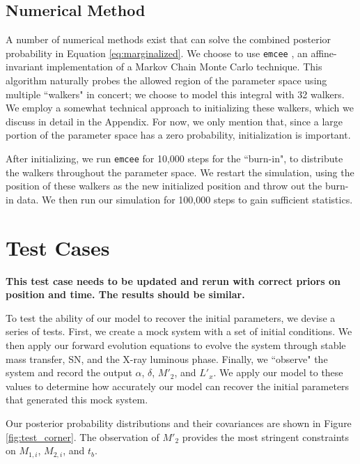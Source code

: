 \documentclass[12pt, preprint]{aastex}
\begin{document}
 


\subsection{Numerical Method}

A number of numerical methods exist that can solve the combined posterior probability in Equation \ref{eq:marginalized}. We choose to use {\tt emcee} \citep{foreman-mackey13}, an affine-invariant implementation of a Markov Chain Monte Carlo technique. This algorithm naturally probes the allowed region of the parameter space using multiple ``walkers" in concert; we choose to model this integral with 32 walkers. We employ a somewhat technical approach to initializing these walkers, which we discuss in detail in the Appendix. For now, we only mention that, since a large portion of the parameter space has a zero probability, initialization is important.

After initializing, we run {\tt emcee} for 10,000 steps for the ``burn-in", to distribute the walkers throughout the parameter space. We restart the simulation, using the position of these walkers as the new initialized position and throw out the burn-in data. We then run our simulation for 100,000 steps to gain sufficient statistics. 





\section{Test Cases}

{\bf This test case needs to be updated and rerun with correct priors on position and time. The results should be similar.}

To test the ability of our model to recover the initial parameters, we devise a series of tests. First, we create a mock system with a set of initial conditions. We then apply our forward evolution equations to evolve the system through stable mass transfer, SN, and the X-ray luminous phase. Finally, we ``observe" the system and record the output $\alpha$, $\delta$, $M'_2$, and $L'_x$. We apply our model to these values to determine how accurately our model can recover the initial parameters that generated this mock system. 

Our posterior probability distributions and their covariances are shown in Figure \ref{fig:test_corner}. The observation of $M'_2$ provides the most stringent constraints on $M_{1,i}$, $M_{2,i}$, and $t_b$.
\end{document}
